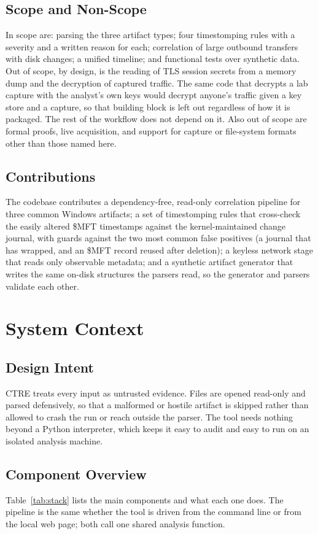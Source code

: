 \documentclass[12pt,onecolumn]{IEEEtran}
\begin{document}
\subsection{Scope and Non-Scope}
In scope are: parsing the three artifact types; four timestomping rules with a severity and a written reason for each; correlation of large outbound transfers with disk changes; a unified timeline; and functional tests over synthetic data. Out of scope, by design, is the reading of TLS session secrets from a memory dump and the decryption of captured traffic. The same code that decrypts a lab capture with the analyst's own keys would decrypt anyone's traffic given a key store and a capture, so that building block is left out regardless of how it is packaged. The rest of the workflow does not depend on it. Also out of scope are formal proofs, live acquisition, and support for capture or file-system formats other than those named here.

\subsection{Contributions}
The codebase contributes a dependency-free, read-only correlation pipeline for three common Windows artifacts; a set of timestomping rules that cross-check the easily altered \$MFT timestamps against the kernel-maintained change journal, with guards against the two most common false positives (a journal that has wrapped, and an \$MFT record reused after deletion); a keyless network stage that reads only observable metadata; and a synthetic artifact generator that writes the same on-disk structures the parsers read, so the generator and parsers validate each other.

\section{System Context}

\subsection{Design Intent}
CTRE treats every input as untrusted evidence. Files are opened read-only and parsed defensively, so that a malformed or hostile artifact is skipped rather than allowed to crash the run or reach outside the parser. The tool needs nothing beyond a Python interpreter, which keeps it easy to audit and easy to run on an isolated analysis machine.

\subsection{Component Overview}
Table~\ref{tab:stack} lists the main components and what each one does. The pipeline is the same whether the tool is driven from the command line or from the local web page; both call one shared analysis function.
\end{document}
